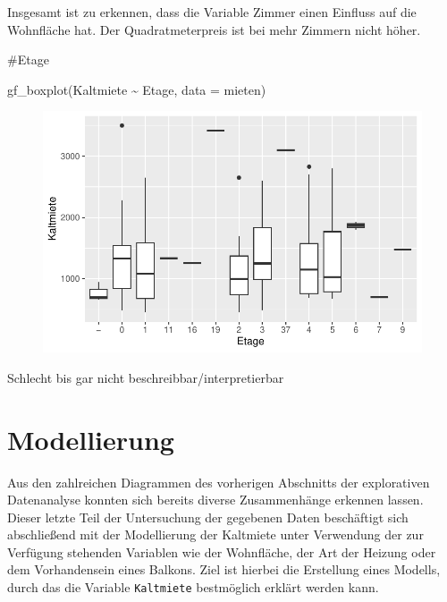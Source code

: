 \documentclass[
  a4paper,
  DIV=11]{scrartcl}
\newenvironment{Shaded}{\begin{snugshade}}{\end{snugshade}}
\newcommand{\AttributeTok}[1]{\textcolor[rgb]{0.40,0.45,0.13}{#1}}
\newcommand{\FunctionTok}[1]{\textcolor[rgb]{0.28,0.35,0.67}{#1}}
\newcommand{\NormalTok}[1]{\textcolor[rgb]{0.00,0.23,0.31}{#1}}
\newcommand{\SpecialCharTok}[1]{\textcolor[rgb]{0.37,0.37,0.37}{#1}}
\begin{document}
Insgesamt ist zu erkennen, dass die Variable Zimmer einen Einfluss auf
die Wohnfläche hat. Der Quadratmeterpreis ist bei mehr Zimmern nicht
höher.

\#Etage

\begin{Shaded}
\begin{Highlighting}[]
\FunctionTok{gf\_boxplot}\NormalTok{(Kaltmiete }\SpecialCharTok{\textasciitilde{}}\NormalTok{ Etage, }\AttributeTok{data =}\NormalTok{ mieten)}
\end{Highlighting}
\end{Shaded}

\begin{figure}[H]

{\centering \includegraphics{Mietmodellierung_files/figure-pdf/unnamed-chunk-15-1.pdf}

}

\end{figure}

Schlecht bis gar nicht beschreibbar/interpretierbar

\hypertarget{modellierung}{%
\section{Modellierung}\label{modellierung}}

Aus den zahlreichen Diagrammen des vorherigen Abschnitts der
explorativen Datenanalyse konnten sich bereits diverse Zusammenhänge
erkennen lassen. Dieser letzte Teil der Untersuchung der gegebenen Daten
beschäftigt sich abschließend mit der Modellierung der Kaltmiete unter
Verwendung der zur Verfügung stehenden Variablen wie der Wohnfläche, der
Art der Heizung oder dem Vorhandensein eines Balkons. Ziel ist hierbei
die Erstellung eines Modells, durch das die Variable \texttt{Kaltmiete}
bestmöglich erklärt werden kann.
\end{document}
